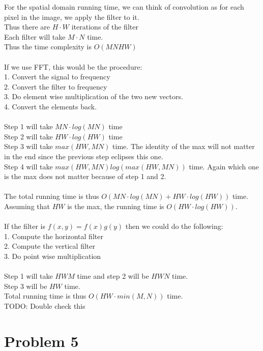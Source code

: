 \documentclass[11pt,psfig]{article}
\begin{document}
For the spatial domain running time, we can think of convolution as for each pixel in the image, we apply the filter to it. \\
Thus there are $H \cdot W$ iterations of the filter\\
Each filter will take $M \cdot N$ time. \\
Thus the time complexity is $O(MNHW)$\\
\\
If we use FFT, this would be the procedure:\\
1. Convert the signal to frequency\\
2. Convert the filter to frequency \\
3. Do element wise multiplication of the two new vectors. \\
4. Convert the elements back. \\
\\
Step 1 will take $MN \cdot log(MN)$ time\\
Step 2 will take $HW \cdot log(HW)$ time\\
Step 3 will take $max(HW,MN)$ time. The identity of the max will not matter in the end since the previous step eclipses this one. \\
Step 4 will take $max(HW,MN) log( max(HW, MN) )$ time. Again which one is the max does not matter because of step 1 and 2. \\
\\
The total running time is thus $O(MN \cdot log(MN) + HW \cdot log(HW) )$ time. \\
Assuming that $HW$ is the max, the running time is $O(HW \cdot log(HW))$. \\
\\
If the filter is $f(x,y) = f(x)g(y)$ then we could do the following:\\
1. Compute the horizontal filter\\
2. Compute the vertical filter\\
3. Do point wise multiplication \\
\\
Step 1 will take $HWM$ time and step 2 will be $HWN$ time. \\
Step 3 will be $HW$ time. \\
Total running time is thus $O( HW \cdot min(M,N))$ time. \\
TODO: Double check this

\section*{Problem 5}
\end{document}
